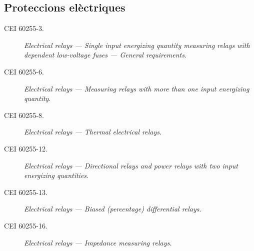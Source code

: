 \subsection*{Proteccions elèctriques}
\begin{description}
    \item [\hspace{5mm}CEI 60255-3.] \textit{Electrical relays --- Single input energizing quantity measuring relays with dependent low-voltage fuses --- General requirements}.
    \item [\hspace{5mm}CEI 60255-6.] \textit{Electrical relays --- Measuring relays with more than one input energizing quantity}.
    \item [\hspace{5mm}CEI 60255-8.] \textit{Electrical relays --- Thermal electrical relays}.
    \item [\hspace{5mm}CEI 60255-12.] \textit{Electrical relays --- Directional relays and power relays with two input energizing quantities}.
    \item [\hspace{5mm}CEI 60255-13.] \textit{Electrical relays --- Biased (percentage) differential relays}.
    \item [\hspace{5mm}CEI 60255-16.] \textit{Electrical relays --- Impedance measuring relays}.
\end{description}

